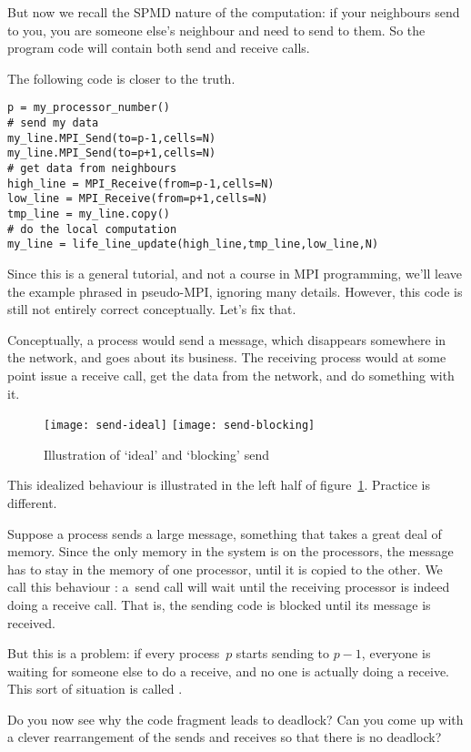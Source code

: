But now we recall the \ac{SPMD} nature of the computation: 
if your neighbours send to you, you are someone else's neighbour and
need to send to them. So the program code will contain both
send and receive calls.

The following code is closer to the truth.
\begin{verbatim}
p = my_processor_number()
# send my data
my_line.MPI_Send(to=p-1,cells=N)
my_line.MPI_Send(to=p+1,cells=N)
# get data from neighbours
high_line = MPI_Receive(from=p-1,cells=N)
low_line = MPI_Receive(from=p+1,cells=N)
tmp_line = my_line.copy()
# do the local computation
my_line = life_line_update(high_line,tmp_line,low_line,N)
\end{verbatim}
Since this is a general tutorial, and not a course in MPI programming,
we'll leave the example phrased in pseudo-MPI, ignoring many details.
However, this code is still not entirely
correct conceptually. Let's fix that.

Conceptually, a process would send a message, which disappears
somewhere in the network, and goes about its business.
The receiving process would at some point issue a receive call,
get the data from the network, and do something with it.
\begin{figure}
  \leavevmode
  \texttt{[image: send-ideal]}\hfill
  \texttt{[image: send-blocking]}
  \caption{Illustration of `ideal' and `blocking' send}
  \label{fig:cw-send-blocking}
\end{figure}
This idealized behaviour is illustrated in the left half of
figure~\ref{fig:cw-send-blocking}. Practice is different.

Suppose a process sends a large message, something that takes
a great deal of memory. Since the only memory in the system
is on the processors, the message has to stay in the memory 
of one processor, until it is copied to the other.
We call this behaviour :
a~send call will wait until the receiving processor is
indeed doing a receive call. That is, the sending code is blocked
until its message is received.

But this is a problem: if every process~$p$ starts sending to $p-1$,
everyone is waiting for someone else to do a receive, and no one is
actually doing a receive. This sort of situation is called
.

\begin{exercise}
  Do you now see why the code fragment
  leads to deadlock? Can you come up with a clever rearrangement of the sends 
  and receives so that there is no deadlock?
\end{exercise}

